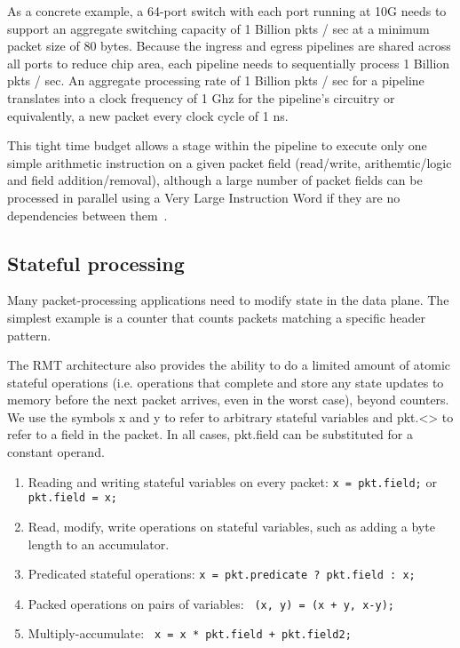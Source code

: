As a concrete example, a 64-port switch with each port running at 10G needs to
support an aggregate switching capacity of 1 Billion pkts / sec at a minimum
packet size of 80 bytes.  Because the ingress and egress pipelines are shared
across all ports to reduce chip area, each pipeline needs to sequentially
process 1 Billion pkts / sec. An aggregate processing rate of 1 Billion pkts /
sec for a pipeline translates into a clock frequency of 1 Ghz for the
pipeline's circuitry or equivalently, a new packet every clock cycle of 1 ns.

This tight time budget allows a stage within the pipeline to execute only one
simple arithmetic instruction on a given packet field (read/write,
arithemtic/logic and field addition/removal), although a large number of packet
fields can be processed in parallel using a Very Large Instruction Word if they
are no dependencies between them~\cite{rmt}.

\subsection{Stateful processing}
Many packet-processing applications need to modify state in the data plane. The
simplest example is a counter that counts packets matching a specific header
pattern.

The RMT architecture also provides the ability to do a limited amount of atomic
stateful operations (i.e. operations that complete and store any state updates to
memory before the next packet arrives, even in the worst case), beyond counters.
We use the symbols x and y to refer to
arbitrary stateful variables and pkt.<> to refer to a field in the packet. In
all cases, pkt.field can be substituted for a constant operand.
\begin{enumerate}
\item Reading and writing stateful variables on every packet:
      \texttt{x = pkt.field;} or \texttt{pkt.field = x;}
\item Read, modify, write operations on stateful variables, such as adding a byte
      length to an accumulator.
\item Predicated stateful operations: \texttt{x = pkt.predicate ? pkt.field : x;}
\item Packed operations on pairs of variables: \texttt{ (x, y) = (x + y, x-y);}
\item Multiply-accumulate: \texttt{ x = x * pkt.field + pkt.field2; }
\end{enumerate}

